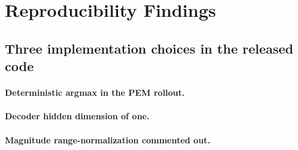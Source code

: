 \section{Reproducibility Findings}
\label{sec:reproducibility}


\subsection{Three implementation choices in the released code}
\label{sec:repro:choices}


\paragraph{Deterministic argmax in the PEM rollout.}

\paragraph{Decoder hidden dimension of one.}

\paragraph{Magnitude range-normalization commented out.}


